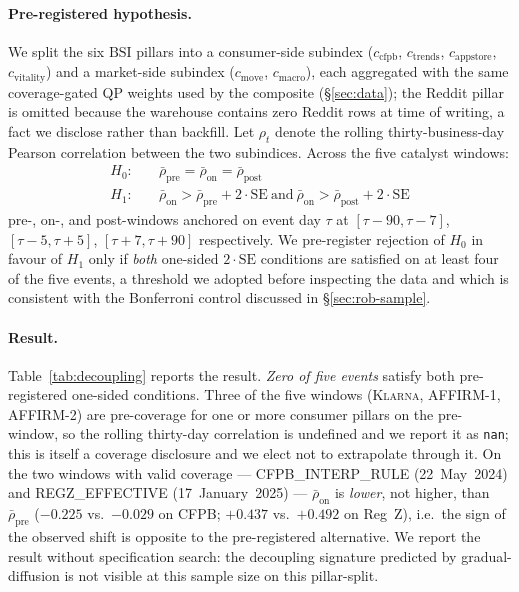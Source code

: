 \documentclass[11pt,letterpaper]{article}
\newcommand{\bsi}{\text{BSI}}
\begin{document}
\paragraph{Pre-registered hypothesis.}
We split the six $\bsi$ pillars into a consumer-side subindex
($c_{\mathrm{cfpb}}$, $c_{\mathrm{trends}}$, $c_{\mathrm{appstore}}$,
$c_{\mathrm{vitality}}$) and a market-side subindex
($c_{\mathrm{move}}$, $c_{\mathrm{macro}}$), each aggregated with the
same coverage-gated QP weights used by the composite
(\S\ref{sec:data}); the Reddit pillar is omitted because the
warehouse contains zero Reddit rows at time of writing, a fact we
disclose rather than backfill. Let $\rho_t$ denote the
rolling thirty-business-day Pearson correlation between the two
subindices. Across the five catalyst windows:
\begin{align*}
H_{0}:\quad & \bar{\rho}_{\mathrm{pre}} = \bar{\rho}_{\mathrm{on}} = \bar{\rho}_{\mathrm{post}} \\
H_{1}:\quad & \bar{\rho}_{\mathrm{on}} > \bar{\rho}_{\mathrm{pre}} + 2\cdot\mathrm{SE}
              \ \text{and}\ \bar{\rho}_{\mathrm{on}} > \bar{\rho}_{\mathrm{post}} + 2\cdot\mathrm{SE}
\end{align*}
pre-, on-, and post-windows anchored on event day $\tau$ at
$[\tau{-}90,\tau{-}7]$, $[\tau{-}5,\tau{+}5]$, $[\tau{+}7,\tau{+}90]$
respectively. We pre-register rejection of $H_0$ in favour of $H_1$
only if \emph{both} one-sided $2\cdot\mathrm{SE}$ conditions are
satisfied on at least four of the five events, a threshold we
adopted before inspecting the data and which is consistent with
the Bonferroni control discussed in \S\ref{sec:rob-sample}.

\paragraph{Result.}
Table~\ref{tab:decoupling} reports the result. \emph{Zero of five
events} satisfy both pre-registered one-sided conditions.
Three of the five windows (\textsc{Klarna}, \textsc{AFFIRM-1},
\textsc{AFFIRM-2}) are pre-coverage for one or more consumer
pillars on the pre-window, so the rolling thirty-day correlation is
undefined and we report it as \texttt{nan}; this is itself a coverage
disclosure and we elect not to extrapolate through it. On the two
windows with valid coverage --- \textsc{CFPB\_INTERP\_RULE}
(22~May~2024) and \textsc{REGZ\_EFFECTIVE} (17~January~2025) ---
$\bar{\rho}_{\mathrm{on}}$ is \emph{lower}, not higher, than
$\bar{\rho}_{\mathrm{pre}}$ ($-0.225$ vs.\ $-0.029$ on CFPB; $+0.437$
vs.\ $+0.492$ on Reg~Z), i.e.\ the sign of the observed shift is
opposite to the pre-registered alternative. We report the result
without specification search: the decoupling signature predicted by
gradual-diffusion is not visible at this sample size on this
pillar-split.
\end{document}
